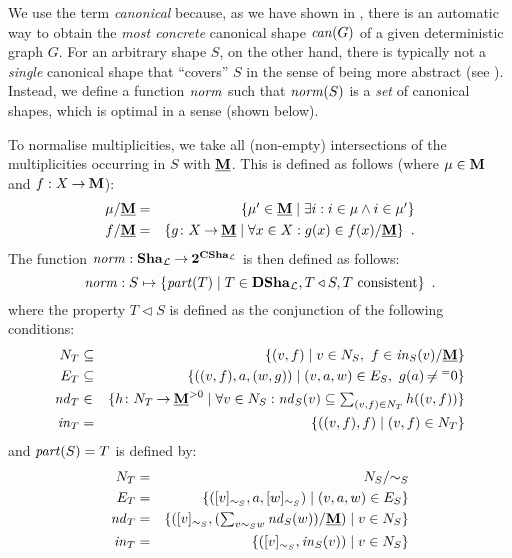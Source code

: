 We use the term \emph{canonical} because, as we have shown in \cite{Rens04-avis}, 
there is an automatic way to obtain the \emph{most
concrete} canonical shape $\mathit{can}(G)$ of a given deterministic graph $G$. 
For an arbitrary shape $S$, on the other hand, there is typically not a
\emph{single} canonical shape that ``covers'' $S$ in the sense of being more
abstract (see ). Instead, we define a function $\mathit{norm}$ such
that $\mathit{norm}(S)$ is a \emph{set} of canonical shapes, which is optimal in a
sense (shown below).

To normalise multiplicities, we take all (non-empty) intersections of the
multiplicities occurring in $S$ with $\underline{\mathbf{M}}$. This is defined as follows (where
$\mu \in \mathbf{M}$ and $f:X \mathbin{\rightarrow} \mathbf{M}$):
%
\begin{eqnarray*}
\mu/\underline{\mathbf{M}} & = & {\textstyle\mathopen\{ \mu'\in \underline{\mathbf{M}} \mid \exists i:i\in \mu \wedge i\in \mu' \mathclose\}} \\
f/\underline{\mathbf{M}} & = & {\textstyle\mathopen\{ g\colon {X} \mathbin{\rightarrow} {\underline{\mathbf{M}}} \mid \forall x\in X:g(x)\in f(x)/\underline{\mathbf{M}} \mathclose\}} \enspace.
\end{eqnarray*}
%
The function $\mathit{norm}:\mathbf{Sha}_{\cal L} \mathbin{\rightarrow} {\mathbf 2}^{\mathbf{CSha}_{\cal L}}$ is then defined as follows:
\[ \mathit{norm}:  S \mapsto 
   {\textstyle\mathopen\{ \mathit{part}(T) \mid T \in \mathbf{DSha}_{\cal L}, 
                          T\triangleleft S,
                          T \mbox{ consistent} \mathclose\}} \enspace.
\]
where the property $T\triangleleft S$ is defined as the conjunction
of the following conditions:
\begin{eqnarray*}
N_T
 & \subseteq
 & {\textstyle\mathopen\{ (v,f) \mid v \in N_S,\ f \in \mathit{in}_S(v)/\underline{\mathbf{M}} \mathclose\}} \\
E_T
 & \subseteq
 & {\textstyle\mathopen\{ ((v,f),a,(w,g)) \mid (v,a,w) \in E_S,\ g(a) \not\nobreak\mkern -2mu = {{}^{=}{0}} \mathclose\}}  \\
\mathit{nd}_T
 & \in
 & {\textstyle\mathopen\{ h\colon {N_T} \mathbin{\rightarrow} {\underline{\mathbf{M}}^{>0}} \mid \forall v \in N_S: \mathit{nd}_S(v) \subseteq \sum_{(v,f) \in N_T} h((v,f)) \mathclose\}} \\
\mathit{in}_T
 & =
 & {\textstyle\mathopen\{ ((v,f),f) \mid (v,f) \in N_T \mathclose\}} 
\end{eqnarray*}
%
and $\mathit{part}(S)=T$ is defined by:
%
\begin{eqnarray*}
N_T
  & = & N_S/{\sim_S} \\
E_T
  & = & {\textstyle\mathopen\{ ([v]_{\sim_S},a,[w]_{\sim_S}) \mid (v,a,w) \in E_S \mathclose\}} \\
\mathit{nd}_T
  & = & {\textstyle\mathopen\{ ([v]_{\sim_S},(\sum_{v \sim_S w} \mathit{nd}_S(w))/\underline{\mathbf{M}}) \mid v \in N_S \mathclose\}} \\
\mathit{in}_T
  & = & {\textstyle\mathopen\{ ([v]_{\sim_S},\mathit{in}_S(v)) \mid v \in N_S \mathclose\}} 
\end{eqnarray*}
